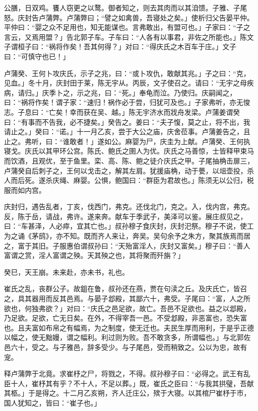 \documentclass[]{article}
\begin{document}
公膳，日双鸡。饔人窃更之以鹜。御者知之，则去其肉而以其洎馈。子雅、子尾怒。庆封告卢蒲弊。卢蒲弊曰；``譬之如禽兽，吾寝处之矣。」使析归父告晏平仲。平仲曰：``婴之众不足用也，知无能谋也。言弗敢出，有盟可也。」子家曰：``子之言云，又焉用盟？」告北郭子车。子车曰：``人各有以事君，非佐之所能也。」陈文子谓桓子曰：``祸将作矣！吾其何得？」对曰：``得庆氏之木百车于庄。」文子曰：``可慎守也已！」

卢蒲癸、王何卜攻庆氏，示子之兆，曰：``或卜攻仇，敢献其兆。」子之曰：``克，见血。」冬十月，庆封田于莱，陈无宇从。丙辰，文子使召之。请曰：``无宇之母疾病，请归。」庆季卜之，示之兆，曰：``死。」奉龟而泣。乃使归。庆嗣闻之，曰：``祸将作矣！谓子家：``速归！祸作必于尝，归犹可及也。」子家弗听，亦无悛志。子息曰：``亡矣！幸而获在吴、越。」陈无宇济水而戕舟发梁。卢蒲姜谓癸曰：``有事而不告我，必不捷矣。」癸告之。姜曰：``夫子愎，莫之止，将不出，我请止之。」癸曰：``诺。」十一月乙亥，尝于大公之庙，庆舍莅事。卢蒲姜告之，且止之。弗听，曰：``谁敢者！」遂如公。麻婴为尸，庆圭为上献。卢蒲癸、王何执寝戈。庆氏以其甲环公宫。陈氏、鲍氏之圉人为优。庆氏之马善惊，士皆释甲束马而饮酒，且观优，至于鱼里。栾、高、陈、鲍之徒介庆氏之甲。子尾抽桷击扉三，卢蒲癸自后刺子之，王何以戈击之，解其左肩。犹援庙桷，动于甍，以俎壶投，杀人而后死。遂杀庆绳、麻婴。公惧，鲍国曰：``群臣为君故也。」陈须无以公归，税服而如内宫。

庆封归，遇告乱者，丁亥，伐西门，弗克。还伐北门，克之。入，伐内宫，弗克。反，陈于岳，请战，弗许。遂来奔。献车于季武子，美泽可以鉴。展庄叔见之，曰：``车甚泽，人必瘁，宜其亡也。」叔孙穆子食庆封，庆封汜祭。穆子不说，使工为之诵《茅鸱》，亦不知。既而齐人来让，奔吴。吴句余予之朱方，聚其族焉而居之，富于其旧。子服惠伯谓叔孙曰：``天殆富淫人，庆封又富矣。」穆子曰：``善人富谓之赏，淫人富谓之殃。天其殃之也，其将聚而歼旃？」

癸巳，天王崩。未来赴，亦未书，礼也。

崔氏之乱，丧群公子。故鉏在鲁，叔孙还在燕，贾在句渎之丘。及庆氏亡，皆召之，具其器用而反其邑焉。与晏子邶殿，其鄙六十，弗受。子尾曰：``富，人之所欲也，何独弗欲？」对曰：``庆氏之邑足欲，故亡。吾邑不足欲也。益之以邶殿，乃足欲。足欲，亡无日矣。在外，不得宰吾一邑。不受邶殿，非恶富也，恐失富也。且夫富如布帛之有幅焉，为之制度，使无迁也。夫民生厚而用利，于是乎正德以幅之，使无黜嫚，谓之幅利。利过则为败。吾不敢贪多，所谓幅也。」与北郭佐邑六十，受之。与子雅邑，辞多受少。与子尾邑，受而稍致之。公以为忠，故有宠。

释卢蒲弊于北竟。求崔杼之尸，将戮之，不得。叔孙穆子曰：``必得之。武王有乱臣十人，崔杼其有乎？不十人，不足以葬。」既，崔氏之臣曰：``与我其拱璧，吾献其柩。」于是得之。十二月乙亥朔，齐人迁庄公，殡于大寝。以其棺尸崔杼于市，国人犹知之，皆曰：``崔子也。」
\end{document}
